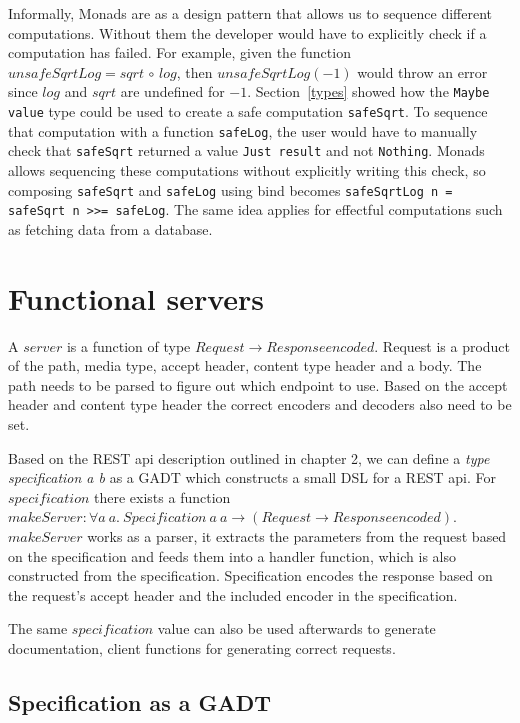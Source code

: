 Informally, Monads are as a design pattern that allows us to sequence different
computations. Without them the developer would have to explicitly check if a
computation has failed. For example, given the function $unsafeSqrtLog =
sqrt\,\circ\,log$, then $unsafeSqrtLog(-1)$ would throw an error since $log$ and
$sqrt$ are undefined for $-1$.  Section~\ref{types} showed how the \texttt{Maybe
value} type could be used to create a safe computation \texttt{safeSqrt}.  To
sequence that computation with a function \texttt{safeLog}, the user would have
to manually check that \texttt{safeSqrt} returned a value \texttt{Just result}
and not \texttt{Nothing}. Monads allows sequencing these computations without
explicitly writing this check, so composing \texttt{safeSqrt} and
\texttt{safeLog} using bind becomes \texttt{safeSqrtLog n = safeSqrt n >>=
safeLog}. The same idea applies for effectful computations such as fetching data
from a database.


\section{Functional servers}

A $server$ is a function of type $Request \rightarrow Response encoded$.
Request is a product of the path, media type, accept header, content type header
and a body. The path needs to be parsed to figure out which endpoint to use.
Based on the accept header and content type header the correct encoders and
decoders also need to be set.

Based on the REST api description outlined in chapter 2, we can define a
\textit{type specification a b} as a GADT which constructs a small DSL for a
REST api. For $specification$ there exists a function $makeServer : \forall a\
a.\ Specification\ a\ a \rightarrow (Request \rightarrow Response encoded)$.
$makeServer$ works as a parser, it extracts the parameters from the request
based on the specification and feeds them into a handler function, which is also
constructed from the specification. Specification encodes the response based on
the request's accept header and the included encoder in the specification.

The same $specification$ value can also be used afterwards to generate
documentation, client functions for generating correct requests.

\subsection{Specification as a GADT}


